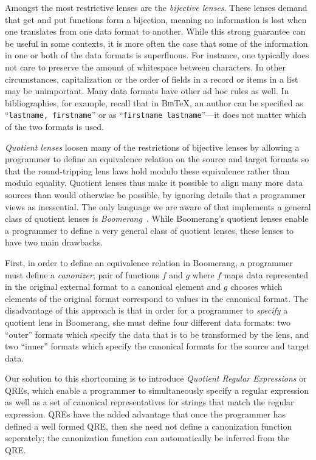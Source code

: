 \documentclass[acmsmall,review,anonymous]{acmart}
\newcommand{\bibtex}{\textsc{Bib}\TeX{}}
\newcommand{\cd}[1]{\lstinline[backgroundcolor=\color{white}]$#1$}
\begin{document}
Amongst the most restrictive lenses are the \emph{bijective lenses}.  These
lenses demand that get and put functions form a bijection, meaning no
information is lost when one translates from one data format to another.  While
this strong guarantee can be useful in some contexts, it is more often the case
that some of the information in one or both of the data formats is superfluous.
For instance, one typically does not care to preserve the amount of
whitespace between characters.  In other circumstances, capitalization
or the order of fields in a record or items in a list may be unimportant. Many
data formats have other ad hoc rules as well. In bibliographies, for example,
recall that in \bibtex{}, an author can be specified as
``\cd{lastname, firstname}'' or as ``\cd{firstname lastname}''---it does not
matter which of the two formats is used.

{\em Quotient lenses} loosen many of the restrictions of bijective lenses by
allowing a programmer to define an equivalence relation on the source and
target formats so that the round-tripping lens laws hold modulo these
equivalence rather than modulo equality. Quotient lenses thus make it possible
to align many more data sources than would otherwise be possible, by ignoring
details that a programmer views as inessential. The only language we are aware
of that implements a general class of quotient lenses is {\em
Boomerang}~\cite{quotientlenses}. While Boomerang's quotient lenses enable a
programmer to define a very general class of quotient lenses, these lenses to
have two main drawbacks.

First, in order to define an equivalence relation in Boomerang, a programmer
must define a {\em canonizer}; pair of functions $f$ and $g$ where $f$ maps
data represented in the original external format to a canonical element and $g$
chooses which elements of the original format correspond to values in the
canonical format. The disadvantage of this approach is that in order for a
programmer to {\em specify} a quotient lens in Boomerang, she must define four
different data formats: two ``outer'' formats which specify the data that is to
be transformed by the lens, and two ``inner'' formats which specify the
canonical formats for the source and target data.

Our solution to this shortcoming is to introduce {\em Quotient Regular
Expressions} or QREs, which enable a programmer to simultaneously specify a
regular expression as well as a set of canonical representatives for strings
that match the regular expression. QREs have the added advantage that once the
programmer has defined a well formed QRE, then she need not define a
canonization function seperately; the canonization function can automatically be
inferred from the QRE.
\end{document}
